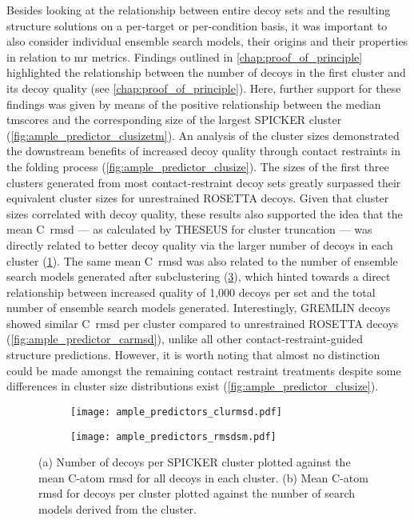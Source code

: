 Besides looking at the relationship between entire decoy sets and the resulting structure solutions on a per-target or per-condition basis, it was important to also consider individual ensemble search models, their origins and their properties in relation to \gls{mr} metrics. Findings outlined in \cref{chap:proof_of_principle} highlighted the relationship between the number of decoys in the first cluster and its decoy quality (see \cref{chap:proof_of_principle}). Here, further support for these findings was given by means of the positive relationship between the median \gls{tmscore}s and the corresponding size of the largest SPICKER cluster (\cref{fig:ample_predictor_clusizetm}). An analysis of the cluster sizes demonstrated the downstream benefits of increased decoy quality through contact restraints in the folding process (\cref{fig:ample_predictor_clusize}). The sizes of the first three clusters generated from most contact-restraint decoy sets greatly surpassed their equivalent cluster sizes for unrestrained ROSETTA decoys. Given that cluster sizes correlated with decoy quality, these results also supported the idea that the mean C\textalpha\ \gls{rmsd} --- as calculated by THESEUS for cluster truncation --- was directly related to better decoy quality via the larger number of decoys in each cluster (\cref{fig:ample_predictor_clurmsd}). The same mean C\textalpha\ \gls{rmsd} was also related to the number of ensemble search models generated after subclustering (\cref{fig:ample_predictor_rmsdsm}), which hinted towards a direct relationship between increased quality of 1,000 decoys per set and the total number of ensemble search models generated. Interestingly, GREMLIN decoys showed similar C\textalpha\ \gls{rmsd} per cluster compared to unrestrained ROSETTA decoys (\cref{fig:ample_predictor_carmsd}), unlike all other contact-restraint-guided structure predictions. However, it is worth noting that almost no distinction could be made amongst the remaining contact restraint treatments despite some differences in cluster size distributions exist (\cref{fig:ample_predictor_clusize}).

\begin{figure}[H]
    \centering
    \begin{subfigure}[b]{0.49\textwidth}
        \texttt{[image: ample\_predictors\_clurmsd.pdf]}
        \caption{}
        \label{fig:ample_predictor_clurmsd}
    \end{subfigure}
    \begin{subfigure}[b]{0.49\textwidth}
        \texttt{[image: ample\_predictors\_rmsdsm.pdf]}
        \caption{}
        \label{fig:ample_predictor_rmsdsm}
    \end{subfigure}

    \caption[SPICKER cluster properties]{(a) Number of decoys per SPICKER cluster plotted against the mean C\textalpha-atom \gls{rmsd} for all decoys in each cluster. (b) Mean C\textalpha-atom \gls{rmsd} for decoys per cluster plotted against the number of search models derived from the cluster.}
\end{figure}

